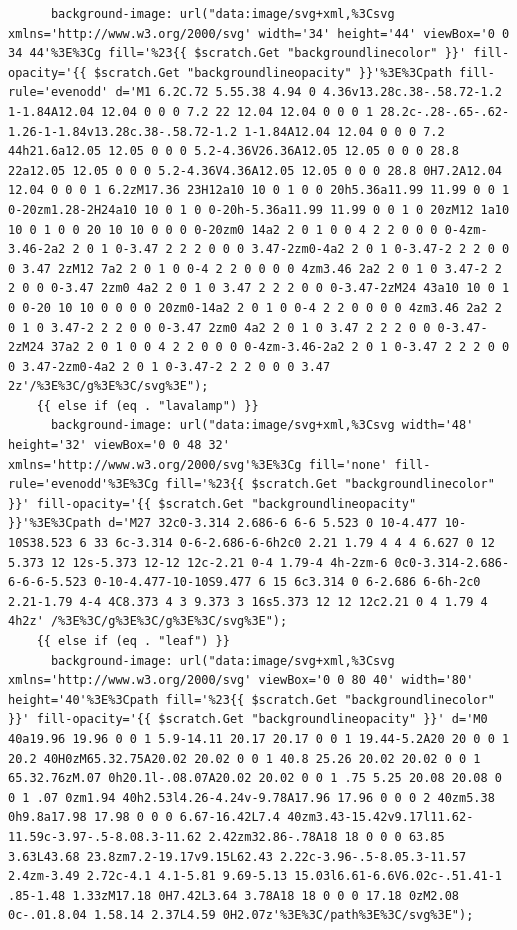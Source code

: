 \documentclass[11pt]{article}
\begin{document}
\begin{enumerate}
\begin{verbatim}
      background-image: url("data:image/svg+xml,%3Csvg xmlns='http://www.w3.org/2000/svg' width='34' height='44' viewBox='0 0 34 44'%3E%3Cg fill='%23{{ $scratch.Get "backgroundlinecolor" }}' fill-opacity='{{ $scratch.Get "backgroundlineopacity" }}'%3E%3Cpath fill-rule='evenodd' d='M1 6.2C.72 5.55.38 4.94 0 4.36v13.28c.38-.58.72-1.2 1-1.84A12.04 12.04 0 0 0 7.2 22 12.04 12.04 0 0 0 1 28.2c-.28-.65-.62-1.26-1-1.84v13.28c.38-.58.72-1.2 1-1.84A12.04 12.04 0 0 0 7.2 44h21.6a12.05 12.05 0 0 0 5.2-4.36V26.36A12.05 12.05 0 0 0 28.8 22a12.05 12.05 0 0 0 5.2-4.36V4.36A12.05 12.05 0 0 0 28.8 0H7.2A12.04 12.04 0 0 0 1 6.2zM17.36 23H12a10 10 0 1 0 0 20h5.36a11.99 11.99 0 0 1 0-20zm1.28-2H24a10 10 0 1 0 0-20h-5.36a11.99 11.99 0 0 1 0 20zM12 1a10 10 0 1 0 0 20 10 10 0 0 0 0-20zm0 14a2 2 0 1 0 0 4 2 2 0 0 0 0-4zm-3.46-2a2 2 0 1 0-3.47 2 2 2 0 0 0 3.47-2zm0-4a2 2 0 1 0-3.47-2 2 2 0 0 0 3.47 2zM12 7a2 2 0 1 0 0-4 2 2 0 0 0 0 4zm3.46 2a2 2 0 1 0 3.47-2 2 2 0 0 0-3.47 2zm0 4a2 2 0 1 0 3.47 2 2 2 0 0 0-3.47-2zM24 43a10 10 0 1 0 0-20 10 10 0 0 0 0 20zm0-14a2 2 0 1 0 0-4 2 2 0 0 0 0 4zm3.46 2a2 2 0 1 0 3.47-2 2 2 0 0 0-3.47 2zm0 4a2 2 0 1 0 3.47 2 2 2 0 0 0-3.47-2zM24 37a2 2 0 1 0 0 4 2 2 0 0 0 0-4zm-3.46-2a2 2 0 1 0-3.47 2 2 2 0 0 0 3.47-2zm0-4a2 2 0 1 0-3.47-2 2 2 0 0 0 3.47 2z'/%3E%3C/g%3E%3C/svg%3E");
    {{ else if (eq . "lavalamp") }}
      background-image: url("data:image/svg+xml,%3Csvg width='48' height='32' viewBox='0 0 48 32' xmlns='http://www.w3.org/2000/svg'%3E%3Cg fill='none' fill-rule='evenodd'%3E%3Cg fill='%23{{ $scratch.Get "backgroundlinecolor" }}' fill-opacity='{{ $scratch.Get "backgroundlineopacity" }}'%3E%3Cpath d='M27 32c0-3.314 2.686-6 6-6 5.523 0 10-4.477 10-10S38.523 6 33 6c-3.314 0-6-2.686-6-6h2c0 2.21 1.79 4 4 4 6.627 0 12 5.373 12 12s-5.373 12-12 12c-2.21 0-4 1.79-4 4h-2zm-6 0c0-3.314-2.686-6-6-6-5.523 0-10-4.477-10-10S9.477 6 15 6c3.314 0 6-2.686 6-6h-2c0 2.21-1.79 4-4 4C8.373 4 3 9.373 3 16s5.373 12 12 12c2.21 0 4 1.79 4 4h2z' /%3E%3C/g%3E%3C/g%3E%3C/svg%3E");
    {{ else if (eq . "leaf") }}
      background-image: url("data:image/svg+xml,%3Csvg xmlns='http://www.w3.org/2000/svg' viewBox='0 0 80 40' width='80' height='40'%3E%3Cpath fill='%23{{ $scratch.Get "backgroundlinecolor" }}' fill-opacity='{{ $scratch.Get "backgroundlineopacity" }}' d='M0 40a19.96 19.96 0 0 1 5.9-14.11 20.17 20.17 0 0 1 19.44-5.2A20 20 0 0 1 20.2 40H0zM65.32.75A20.02 20.02 0 0 1 40.8 25.26 20.02 20.02 0 0 1 65.32.76zM.07 0h20.1l-.08.07A20.02 20.02 0 0 1 .75 5.25 20.08 20.08 0 0 1 .07 0zm1.94 40h2.53l4.26-4.24v-9.78A17.96 17.96 0 0 0 2 40zm5.38 0h9.8a17.98 17.98 0 0 0 6.67-16.42L7.4 40zm3.43-15.42v9.17l11.62-11.59c-3.97-.5-8.08.3-11.62 2.42zm32.86-.78A18 18 0 0 0 63.85 3.63L43.68 23.8zm7.2-19.17v9.15L62.43 2.22c-3.96-.5-8.05.3-11.57 2.4zm-3.49 2.72c-4.1 4.1-5.81 9.69-5.13 15.03l6.61-6.6V6.02c-.51.41-1 .85-1.48 1.33zM17.18 0H7.42L3.64 3.78A18 18 0 0 0 17.18 0zM2.08 0c-.01.8.04 1.58.14 2.37L4.59 0H2.07z'%3E%3C/path%3E%3C/svg%3E");

\end{verbatim}
\end{enumerate}
\end{document}
